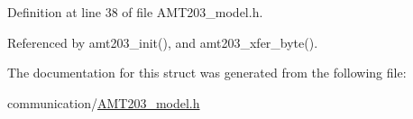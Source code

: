 Definition at line 38 of file A\-M\-T203\-\_\-model.\-h.



Referenced by amt203\-\_\-init(), and amt203\-\_\-xfer\-\_\-byte().



The documentation for this struct was generated from the following file\-:\begin{DoxyCompactItemize}
\item 
communication/\hyperlink{AMT203__model_8h}{A\-M\-T203\-\_\-model.\-h}\end{DoxyCompactItemize}
